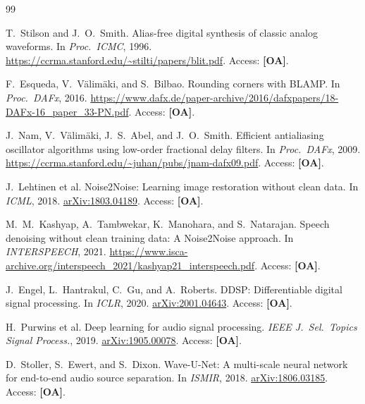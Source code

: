 \documentclass[10pt,twocolumn,letterpaper]{article}
\begin{document}
\FloatBarrier
\clearpage
\raggedbottom
\balance
{\footnotesize
\setlength{\baselineskip}{11.5pt}
\begin{thebibliography}{99}
\setlength{\itemsep}{0.25ex plus 0.05ex}
\setlength{\parsep}{0pt}
\setlength{\parskip}{0pt}

T.~Stilson and J.~O.~Smith.
\newblock Alias-free digital synthesis of classic analog waveforms.
\newblock In \emph{Proc.\ ICMC}, 1996.
\newblock \url{https://ccrma.stanford.edu/~stilti/papers/blit.pdf}.
\newblock Access: \textbf{[OA]}.

F.~Esqueda, V.~V\"alim\"aki, and S.~Bilbao.
\newblock Rounding corners with BLAMP.
\newblock In \emph{Proc.\ DAFx}, 2016.
\newblock \url{https://www.dafx.de/paper-archive/2016/dafxpapers/18-DAFx-16_paper_33-PN.pdf}.
\newblock Access: \textbf{[OA]}.

J.~Nam, V.~V\"alim\"aki, J.~S.~Abel, and J.~O.~Smith.
\newblock Efficient antialiasing oscillator algorithms using low-order fractional delay filters.
\newblock In \emph{Proc.\ DAFx}, 2009.
\newblock \url{https://ccrma.stanford.edu/~juhan/pubs/jnam-dafx09.pdf}.
\newblock Access: \textbf{[OA]}.

J.~Lehtinen et al.
\newblock Noise2Noise: Learning image restoration without clean data.
\newblock In \emph{ICML}, 2018.
\newblock \href{https://arxiv.org/abs/1803.04189}{arXiv:1803.04189}.
\newblock Access: \textbf{[OA]}.

M.~M.~Kashyap, A.~Tambwekar, K.~Manohara, and S.~Natarajan.
\newblock Speech denoising without clean training data: A Noise2Noise approach.
\newblock In \emph{INTERSPEECH}, 2021.
\newblock \url{https://www.isca-archive.org/interspeech_2021/kashyap21_interspeech.pdf}.
\newblock Access: \textbf{[OA]}.

J.~Engel, L.~Hantrakul, C.~Gu, and A.~Roberts.
\newblock DDSP: Differentiable digital signal processing.
\newblock In \emph{ICLR}, 2020.
\newblock \href{https://arxiv.org/abs/2001.04643}{arXiv:2001.04643}.
\newblock Access: \textbf{[OA]}.

H.~Purwins et al.
\newblock Deep learning for audio signal processing.
\newblock \emph{IEEE J.\ Sel.\ Topics Signal Process.}, 2019.
\newblock \href{https://arxiv.org/abs/1905.00078}{arXiv:1905.00078}.
\newblock Access: \textbf{[OA]}.

D.~Stoller, S.~Ewert, and S.~Dixon.
\newblock Wave-U-Net: A multi-scale neural network for end-to-end audio source separation.
\newblock In \emph{ISMIR}, 2018.
\newblock \href{https://arxiv.org/abs/1806.03185}{arXiv:1806.03185}.
\newblock Access: \textbf{[OA]}.


\end{thebibliography}}
\end{document}
